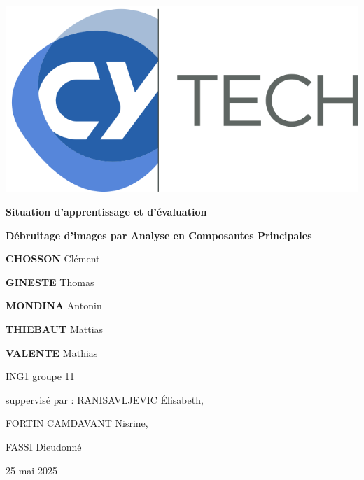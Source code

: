 \begin{titlepage}
    
    \includegraphics[width=0.5\linewidth]{reference/picture/CYTECHlogo.png}\par\vspace{1cm}
    \vspace{0.5cm}
    \begin{center}
        {\Huge \bfseries Situation d'apprentissage et d'évaluation \par}
        {\Huge \bfseries Débruitage d'images par Analyse en Composantes Principales \par}
    \end{center}
    
    
    \vspace{4cm}
    {\Large \textbf{CHOSSON} Clément\par}
    {\Large \textbf{GINESTE} Thomas \par}
    {\Large \textbf{MONDINA} Antonin \par}
    {\Large \textbf{THIEBAUT} Mattias \par}
    {\Large \textbf{VALENTE} Mathias \par}
    \vspace{0.5cm}
    {\large ING1 groupe 11 \par}
    \vspace{3cm}
    {\raggedleft
    suppervisé par :  RANISAVLJEVIC Élisabeth, \par
      
    FORTIN CAMDAVANT Nisrine, \par
      
    FASSI Dieudonné \par
     }
    \vfill
    \begin{center}
        25 mai 2025
    \end{center}
\end{titlepage}

\tableofcontents
